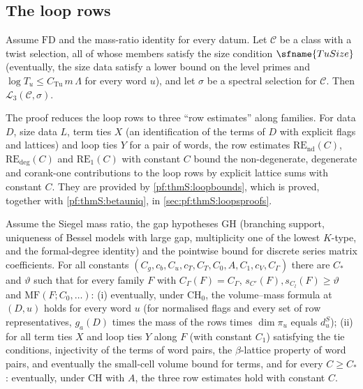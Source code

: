 \subsection{The loop rows}\label{sec:pf:thmS:loops}

\begin{theorem}\label{pf:thmS:loops}
Assume $\mathrm{FD}$ and the mass-ratio identity for every datum. Let $\mathcal C$ be a class with a twist
selection, all of whose members satisfy the size condition $\sfname{TuSize}$ (eventually, the size data satisfy
a lower bound on the level primes and $\log T_u\le C_{\mathrm{Tu}}\,m\,\Lambda$ for every word $u$), and let $\sigma$ be a spectral selection for
$\mathcal C$. Then $\mathcal{L}_{3}(\mathcal C,\sigma)$.
\end{theorem}

The proof reduces the loop rows to three ``row estimates'' along families. For data $D$, size data $L$, term ties $X$ (an identification of the terms of $D$ with explicit flags
and lattices) and loop ties $Y$ for a pair of words, the row estimates $\mathrm{RE}_{\mathrm{nd}}(C)$, $\mathrm{RE}_{\mathrm{deg}}(C)$ and $\mathrm{RE}_{1}(C)$ with constant $C$ bound the non-degenerate, degenerate and corank-one contributions to the loop rows
by explicit lattice sums with constant $C$. They are provided by \cref{pf:thmS:loopbounds}, which is proved, together with
\cref{pf:thmS:betauniq}, in \cref{sec:pf:thmS:loopsproofs}.

\begin{theorem}\label{pf:thmS:loopbounds}
Assume the Siegel mass ratio,
the gap hypotheses $\mathrm{GH}$ (branching support, uniqueness of Bessel models with large gap,
multiplicity one of the lowest $K$-type, and the formal-degree identity) and the pointwise bound for discrete
series matrix coefficients. For all constants $(C_g,c_b,C_u,c_T,C_T,C_0,A,C_1,c_V,C_\Gamma)$ there are $C_*$ and
$\vartheta$ such that for every family $F$ with $C_\Gamma(F)=C_\Gamma$, $s_{C'}(F),s_{C_l}(F)\ge\vartheta$ and
$\mathrm{MF}(F;C_0,\dots)$: (i) eventually, under $\mathrm{CH}_0$, the volume--mass formula at $(D,u)$
holds for every word $u$ (for normalised flags and every set of row representatives, $g_a(D)$ times the mass of the rows
times $\dim\pi_u$ equals $d^S_u$); (ii) for all term ties $X$ and loop ties $Y$ along $F$ (with constant $C_1$) satisfying
the tie conditions, injectivity of the terms of word pairs, the $\beta$-lattice property of word pairs, and eventually
the small-cell volume bound for terms, and for every $C\ge C_*$: eventually, under $\mathrm{CH}$ with $A$, the three
row estimates hold with constant $C$.
\end{theorem}

